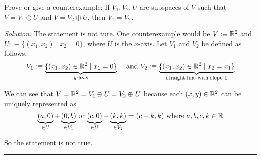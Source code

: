 \setcounter{xrcs}{22}
\begin{xrcs}
  Prove or give a counterexample: If $V_1, V_2, U$ are subspaces of $V$ such that $V=V_1 \oplus U$ and $V=V_2 \oplus U$, then $V_1 = V_2$.

  \emph{Solution:} The statement is not ture. One counterexample would be $V :\equiv \mathbb{R}^2$ and $U :\equiv \{ (x_1, x_2) \mid x_2=0 \}$, where $U$ is the $x$-axis. Let $V_1$ and $V_2$ be defined as follows:
  \[
    V_1 :\equiv \underbrace{\{(x_1, x_2) \in \real^2 \mid x_1 = 0 \}}_{\text{$y$-axis}} \quad $ and $
    V_2 :\equiv \underbrace{\{ (x_1, x_2) \in \real^2 \mid x_2 = x_1 \}}_{\text{straight line with slope $1$}}
  \]

  We can see that $V=\mathbb{R}^2=V_1 \oplus U = V_2 \oplus U$  because each $(x,y)\in \mathbb{R}^2$ can be uniquely represented as \begin{equation}
    \underbrace{(a,0)}_{\in U}+\underbrace{(0,b)}_{\in V_1}$ or $\underbrace{(c,0)}_{\in U}+\underbrace{(k,k)}_{\in V_2}=(c+k,k)$ where $a,b,c,k \in \real
  \end{equation}

  So the statement is not true.
\end{xrcs}

\phantom{.}

\hrule